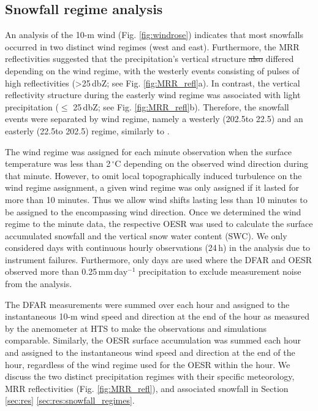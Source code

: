 \documentclass{ametsocV5}
\providecommand{\DIFdel}[1]{{\protect\color{red}\sout{#1}}}                      %
\providecommand{\DIFdelbegin}{} %
\providecommand{\DIFdelend}{} %
\newcommand{\DIFscaledelfig}{0.5}
\newlength{\DIFdelgraphicswidth} %
\newlength{\DIFdelgraphicsheight} %
\newcommand{\DIFdelincludegraphics}[2][]{%
\sbox{\DIFdelgraphicsbox}{\DIFOincludegraphics[#1]{#2}}%
\settoboxwidth{\DIFdelgraphicswidth}{\DIFdelgraphicsbox} %
\settoboxtotalheight{\DIFdelgraphicsheight}{\DIFdelgraphicsbox} %
\scalebox{\DIFscaledelfig}{%
\parbox[b]{\DIFdelgraphicswidth}{\usebox{\DIFdelgraphicsbox}\\[-\baselineskip] \rule{\DIFdelgraphicswidth}{0em}}\llap{\resizebox{\DIFdelgraphicswidth}{\DIFdelgraphicsheight}{%
\setlength{\unitlength}{\DIFdelgraphicswidth}%
\begin{picture}(1,1)%
\thicklines\linethickness{2pt} %
{\color[rgb]{1,0,0}\put(0,0){\framebox(1,1){}}}%
{\color[rgb]{1,0,0}\put(0,0){\line( 1,1){1}}}%
{\color[rgb]{1,0,0}\put(0,1){\line(1,-1){1}}}%
\end{picture}%
}\hspace*{3pt}}} %
} %
\DeclareRobustCommand{\DIFdelbegin}{\DIFOdelbegin \let\includegraphics\DIFdelincludegraphics} %
\DeclareRobustCommand{\DIFdelend}{\DIFOaddend \let\includegraphics\DIFOincludegraphics} %
\begin{document}
	\subsection{Snowfall regime analysis}\label{sec:methodology:snowfall_reg}
		An analysis of the 10-m wind (Fig. \ref{fig:windrose}) indicates that most snowfalls occurred in two distinct wind regimes (west and east). Furthermore, the MRR reflectivities suggested that the precipitation's vertical structure \DIFdelbegin \DIFdel{also }\DIFdelend differed depending on the wind regime, with the westerly events consisting of pulses of high reflectivities (\textgreater 25\,dbZ; see Fig. \ref{fig:MRR_refl}a). In contrast, the vertical reflectivity structure during the easterly wind regime was associated with light precipitation ($\leq$ 25\,dbZ; see Fig. \ref{fig:MRR_refl}b). Therefore, the snowfall events were separated by wind regime, namely a westerly (202.5\textdegree to 22.5\textdegree) and an easterly (22.5\textdegree to 202.5\textdegree) regime, similarly to \citet{schirle_estimation_2019}. 

		The wind regime was assigned for each minute observation when the surface temperature was less than 2\,$^{\circ}$C depending on the observed wind direction during that minute. However, to omit local topographically induced turbulence on the wind regime assignment, a given wind regime was only assigned if it lasted for more than 10 minutes. Thus we allow wind shifts lasting less than 10 minutes to be assigned to the encompassing wind direction. Once we determined the wind regime to the minute data, the respective OESR was used to calculate the surface accumulated snowfall and the vertical snow water content (SWC). We only considered days with continuous hourly observations (24\,h) in the analysis due to instrument failures. Furthermore, only days are used where the DFAR and OESR observed more than 0.25\,mm\,day$^{-1}$ precipitation to exclude measurement noise from the analysis.	

		The DFAR measurements were summed over each hour and assigned to the instantaneous 10-m wind speed and direction at the end of the hour as measured by the anemometer at HTS to make the observations and simulations comparable. Similarly, the OESR surface accumulation was summed each hour and assigned to the instantaneous wind speed and direction at the end of the hour, regardless of the wind regime used for the OESR within the hour. We discuss the two distinct precipitation regimes with their specific meteorology, MRR reflectivities (Fig. \ref{fig:MRR_refl}), and associated snowfall in Section \ref{sec:res} \ref{sec:res:snowfall_regimes}.
\end{document}
